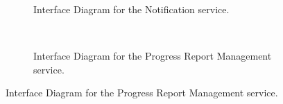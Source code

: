 \documentclass[12pt]{article}
\begin{document}
\begin{figure}[H]
\begin{subfigure}[H]{0.47\textwidth}
\centering	
{}
\caption{Interface Diagram for the Notification service.}
\end{subfigure}
~
\begin{subfigure}[H]{0.47\textwidth}
\centering	
{}
\caption{Interface Diagram for the Progress Report Management service.}
\end{subfigure}
\end{figure}
\end{document}
